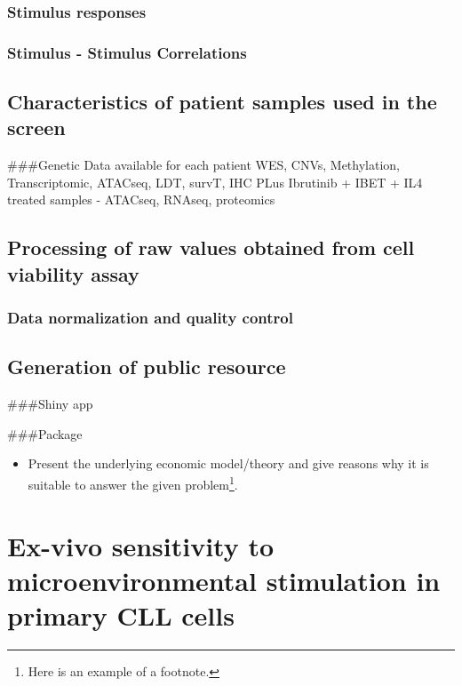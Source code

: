 \documentclass[11pt, a4paper, twosided]{book}
\providecommand{\tightlist}{%
  \setlength{\itemsep}{0pt}\setlength{\parskip}{0pt}}
\begin{document}
\hypertarget{stimulus-responses}{%
\subsection{Stimulus responses}\label{stimulus-responses}}

\hypertarget{stimulus---stimulus-correlations}{%
\subsection{Stimulus - Stimulus Correlations}\label{stimulus---stimulus-correlations}}

\hypertarget{characteristics-of-patient-samples-used-in-the-screen}{%
\section{Characteristics of patient samples used in the screen}\label{characteristics-of-patient-samples-used-in-the-screen}}

\#\#\#Genetic Data available for each patient
WES, CNVs, Methylation, Transcriptomic, ATACseq, LDT, survT, IHC
PLus Ibrutinib + IBET + IL4 treated samples - ATACseq, RNAseq, proteomics

\hypertarget{processing-of-raw-values-obtained-from-cell-viability-assay}{%
\section{Processing of raw values obtained from cell viability assay}\label{processing-of-raw-values-obtained-from-cell-viability-assay}}

\hypertarget{data-normalization-and-quality-control}{%
\subsection{Data normalization and quality control}\label{data-normalization-and-quality-control}}

\hypertarget{generation-of-public-resource}{%
\section{Generation of public resource}\label{generation-of-public-resource}}

\#\#\#Shiny app

\#\#\#Package
\begin{itemize}
\tightlist
\item
  Present the underlying economic model/theory and give reasons why it is
  suitable to answer the given problem\footnote{Here is an example of a footnote.}.
\end{itemize}
\hypertarget{ex-vivo-sensitivity-to-microenvironmental-stimulation-in-primary-cll-cells}{%
\chapter{Ex-vivo sensitivity to microenvironmental stimulation in primary CLL cells}\label{ex-vivo-sensitivity-to-microenvironmental-stimulation-in-primary-cll-cells}}
\end{document}
